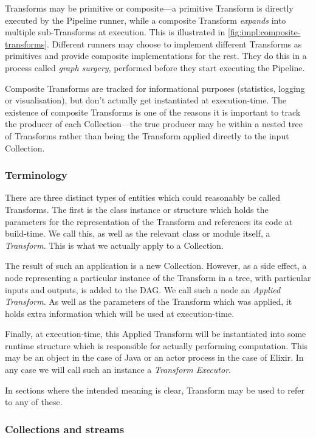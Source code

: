 Transforms may be primitive or composite---a primitive Transform is directly executed by the Pipeline runner, while a composite Transform \emph{expands} into multiple sub-Transforms at execution.
This is illustrated in \cref{fig:impl:composite-transforms}.
Different runners may choose to implement different Transforms as primitives and provide composite implementations for the rest.
They do this in a process called \emph{graph surgery}, performed before they start executing the Pipeline.

Composite Transforms are tracked for informational purposes (statistics, logging or visualisation), but don't actually get instantiated at execution-time.
The existence of composite Transforms is one of the reasons it is important to track the producer of each Collection---the true producer may be within a nested tree of Transforms rather than being the Transform applied directly to the input Collection.

\subsubsection{Terminology}

There are three distinct types of entities which could reasonably be called Transforms.
The first is the class instance or structure which holds the parameters for the representation of the Transform and references its code at build-time.
We call this, as well as the relevant class or module itself, a \emph{Transform}.
This is what we actually apply to a Collection.

The result of such an application is a new Collection.
However, as a side effect, a node representing a particular instance of the Transform in a tree, with particular inputs and outputs, is added to the DAG.
We call such a node an \emph{Applied Transform}.
As well as the parameters of the Transform which was applied, it holds extra information which will be used at execution-time.

Finally, at execution-time, this Applied Transform will be instantiated into some runtime structure which is responsible for actually performing computation.
This may be an object in the case of Java or an actor process in the case of Elixir.
In any case we will call such an instance a \emph{Transform Executor}.

In sections where the intended meaning is clear, Transform may be used to refer to any of these.

\subsubsection{Collections and streams}

